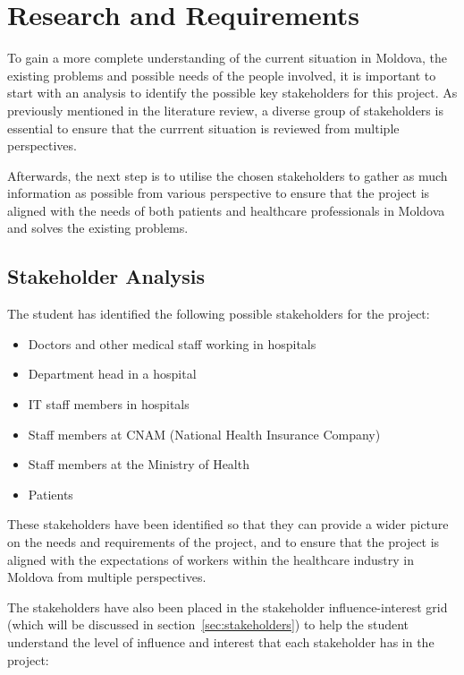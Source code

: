 \chapter{Research and Requirements}

To gain a more complete understanding of the current situation in Moldova, the existing problems and possible needs of the people involved, it is important to start with an analysis to identify the possible key stakeholders for this project. As previously mentioned in the literature review, a diverse group of stakeholders is essential to ensure that the currrent situation is reviewed from multiple perspectives. 

Afterwards, the next step is to utilise the chosen stakeholders to gather as much information as possible from various perspective to ensure that the project is aligned with the needs of both patients and healthcare professionals in Moldova and solves the existing problems.

\section{Stakeholder Analysis}

The student has identified the following possible stakeholders for the project:

\begin{itemize}
    \item Doctors and other medical staff working in hospitals
    \item Department head in a hospital
    \item IT staff members in hospitals
    \item Staff members at CNAM (National Health Insurance Company)
    \item Staff members at the Ministry of Health 
    \item Patients 
\end{itemize}

These stakeholders have been identified so that they can provide a wider picture on the needs and requirements of the project, and to ensure that the project is aligned with the expectations of workers within the healthcare industry in Moldova from multiple perspectives. 

The stakeholders have also been placed in the stakeholder influence-interest grid (which will be discussed in section~\ref{sec:stakeholders}) to help the student understand the level of influence and interest that each stakeholder has in the project:

